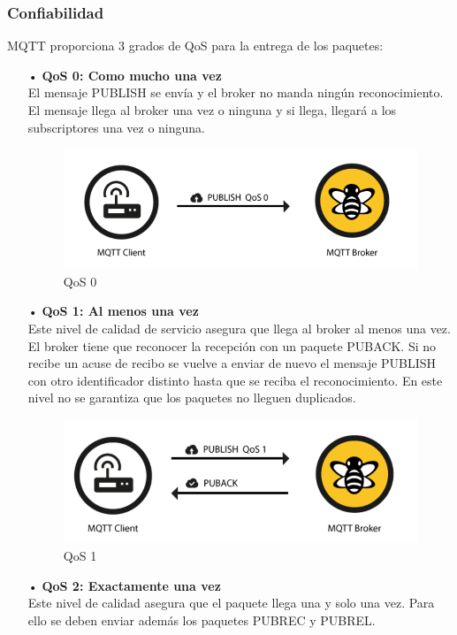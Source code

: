 \documentclass[12pt, twoside]{book}
\begin{document}
\subsubsection*{Confiabilidad}
MQTT proporciona 3 grados de QoS para la entrega de los paquetes:
\begin{itemize}
\item[•]\textbf{QoS 0: Como mucho una vez}\\
El mensaje PUBLISH se envía y el broker no manda ningún reconocimiento. El mensaje llega al broker una vez o ninguna y si llega, llegará a los subscriptores una vez o ninguna.
\begin{figure}[h!]
\centering
\includegraphics[scale=0.3]{images/qos0}
\caption{QoS 0}\label{L406}
\end{figure}
\item[•]\textbf{QoS 1: Al menos una vez}\\
Este nivel de calidad de servicio asegura que llega al broker al menos una vez. El broker tiene que reconocer la recepción con un paquete PUBACK. Si no recibe un acuse de recibo se vuelve a enviar de nuevo el mensaje PUBLISH con otro identificador distinto hasta que se reciba el reconocimiento. En este nivel no se garantiza que los paquetes no lleguen duplicados.
\begin{figure}[H]
\centering
\includegraphics[scale=0.3]{images/qos1}
\caption{QoS 1}\label{L407}
\end{figure}
\item[•] \textbf{QoS 2: Exactamente una vez}\\
Este nivel de calidad asegura que el paquete llega una y solo una vez. Para ello se deben enviar además los paquetes PUBREC y PUBREL.

\end{itemize}
\end{document}
